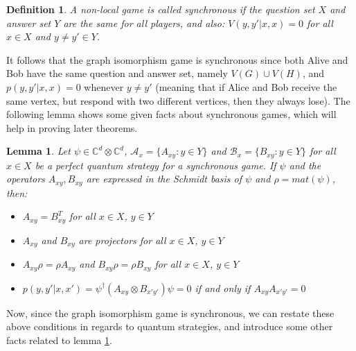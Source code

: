 \documentclass[12pt]{article}
\newtheorem{lem}[thm]{Lemma}
\newtheorem{defn}[thm]{Definition}
\begin{document}
\begin{defn}
A non-local game is called synchronous if the question set $X$ and answer set $Y$ are the same for all players, and also: $V(y, y'|x, x) = 0$ for all $x \in X$ and $y \neq y' \in Y$.
\end{defn}

It follows that the graph isomorphism game is synchronous since both Alive and Bob have the same question and answer set, namely $V(G) \cup V(H)$, and $p(y, y'|x, x) = 0$ whenever $y \neq y'$ (meaning that if Alice and Bob receive the same vertex, but respond with two different vertices, then they always lose). The following lemma shows some given facts about synchronous games, which will help in proving later theorems.

\begin{lem}
\label{synclem}
Let $\psi \in \mathbb{C}^d \otimes \mathbb{C}^d$, $\mathcal{A}_x = \{A_{xy}: y \in Y\}$ and $\mathcal{B}_x = \{B_{xy}: y \in Y\}$ for all $x \in X$ be a perfect quantum strategy for a synchronous game. If $\psi$ and the operators $A_{xy}, B_{xy}$ are expressed in the Schmidt basis of $\psi$ and $\rho = mat(\psi)$, then:
\begin{itemize}
\item $A_{xy} = B_{xy}^T$ for all $x \in X$, $y \in Y$
\item $A_{xy}$ and $B_{xy}$ are projectors for all $x \in X$, $y \in Y$
\item $A_{xy} \rho = \rho A_{xy}$ and $B_{xy} \rho = \rho B_{xy}$ for all $x \in X$, $y \in Y$
\item $p(y, y'|x, x') = \psi^{\dag} (A_{xy} \otimes B_{x'y'}) \psi = 0$ if and only if $A_{xy}A_{x'y'} = 0$
\end{itemize}
\end{lem}

Now, since the graph isomorphism game is synchronous, we can restate these above conditions in regards to quantum strategies, and introduce some other facts related to lemma \ref{synclem}.
\end{document}
